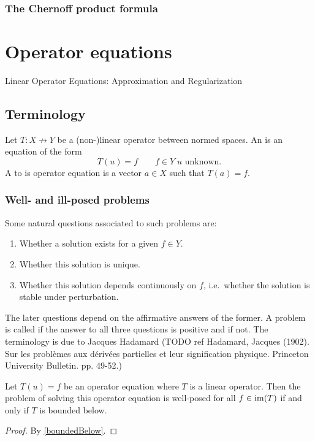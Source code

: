 \subsection{The Chernoff product formula}

\chapter{Operator equations}
Linear Operator Equations: Approximation and Regularization
\section{Terminology}
\begin{definition}
Let $T: X\not\to Y$ be a (non-)linear operator between normed spaces. An  is an equation of the form
\[ T(u) = f \qquad f\in Y\; \text{$u$ unknown.} \]
A  to is operator equation is a vector $a\in X$ such that $T(a) = f$.
\end{definition}
\subsection{Well- and ill-posed problems}
Some natural questions associated to such problems are:
\begin{enumerate}
\item Whether a solution exists for a given $f\in Y$.
\item Whether this solution is unique.
\item Whether this solution depends continuously on $f$, i.e.\ whether the solution is stable under perturbation.
\end{enumerate}
The later questions depend on the affirmative answers of the former. A problem is called  if the answer to all three questions is positive and  if not. The terminology is due to Jacques Hadamard (TODO ref Hadamard, Jacques (1902). Sur les problèmes aux dérivées partielles et leur signification physique. Princeton University Bulletin. pp. 49-52.)

\begin{proposition}
Let $ T(u) = f$ be an operator equation where $T$ is a linear operator. Then the problem of solving this operator equation is well-posed for all $f\in\operatorname{im}(T)$ \textup{if and only if} $T$ is bounded below.
\end{proposition}
\begin{proof}
By \ref{boundedBelow}.
\end{proof}

